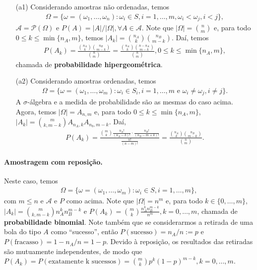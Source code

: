 \documentclass[../Notas.tex]{subfiles}
\begin{document}
\begin{itemize}
    \item[(a1)] Considerando amostras não ordenadas, temos
    \begin{align*}
        \Omega = \{ \omega = (\omega_1, \dots, \omega_n) : \omega_i\in S, i = 1, \dots, m, \omega_i < \omega_j, i < j \},
    \end{align*}
    $\mathcal{A} = \mathcal{P}(\Omega)$ e $P(A) = |A|/|\Omega|, \forall A\in\mathcal{A}$. Note que $\displaystyle{|\Omega| = \binom{n}{m}}$ e, para todo $0\leq k\leq\min\{n_A,m\}$, temos $\displaystyle{|A_k| = \binom{n_A}{k}\binom{n_B}{m-k}}$. Daí, temos
    \begin{align*}
        P(A_k) = \frac{\binom{n_A}{k}\binom{n_B}{m-k}}{\binom{n}{m}} = \frac{\binom{n_A}{k}\binom{n-n_A}{m-k}}{\binom{n}{m}}, 0\leq k\leq\min\{n_A, m\},
    \end{align*}
    chamada de \textbf{probabilidade hipergeométrica}.
    
    \item[(a2)] Considerando amostras ordenadas, temos
    \begin{align*}
        \Omega = \{ \omega = (\omega_1, \dots, \omega_m) : \omega_i\in S_i, i=1, \dots, m \text{ e } \omega_i\neq\omega_j, i\neq j \}. 
    \end{align*}
    A $\sigma$-álgebra e a medida de probabilidade são as mesmas do caso acima. Agora, temos $|\Omega| = A_{n,m}$ e, para todo $0\leq k\leq\min\{n_A, m\}$, $\displaystyle{|A_k| = \binom{m}{k, m-k}A_{n_A, k}A_{n_b, m-k}}$. Daí,
    \begin{align*}
        P(A_k) = \frac{ \binom{m}{k}\frac{n_A!}{(n_A - k)!}\cdot\frac{n_B!}{(n_B - m + k)!} }{\frac{n!}{(n-m)!}} = \frac{ \binom{n_A}{k}\binom{n_B}{m-k} }{\binom{n}{m}}.
    \end{align*}
\end{itemize}

\paragraph{Amostragem com reposição.} Neste caso, temos
\begin{align*}
    \Omega = \{ \omega = (\omega_1, \dots, \omega_m) : \omega_i \in S, i = 1, \dots, m \},
\end{align*}
com $m\leq n$ e $\mathcal{A}$ e $P$ como acima. Note que $|\Omega| = n^m$ e, para todo $k\in\{0, \dots, m\}$, $\displaystyle{|A_k| = \binom{m}{k, m-k}n_A^kn_B^{m-k} }$ e $\displaystyle{P(A_k) = \binom{m}{k}\frac{n_A^kn_B^{m-k}}{n^m}, k = 0, \dots, m }$, chamada de \textbf{probabilidade binomial}. Note também que se considerarmos a retirada de uma bola do tipo $A$ como ``sucesso'', então $P(\text{sucesso}) = n_A/n := p$ e $P(\text{fracasso}) = 1 - n_A/n = 1 - p$. Devido à reposição, os resultados das retiradas são mutuamente independentes, de modo que $P(A_k) = \displaystyle{ P(\text{exatamente k sucessos}) = \binom{m}{k}p^k(1-p)^{m-k}, k=0, \dots, m }$.
\end{document}
